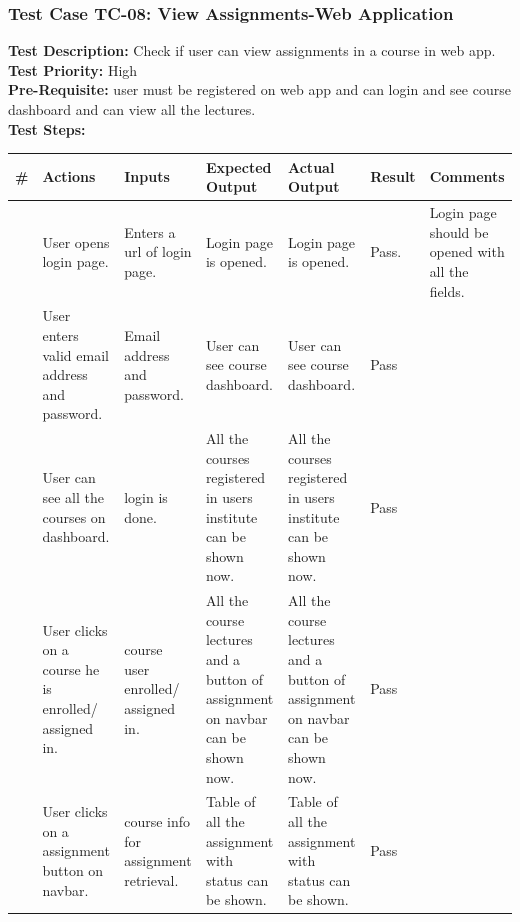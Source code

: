 \documentclass[12pt]{article}
\begin{document}
\subsubsection{Test Case TC-08: View Assignments-Web Application}
\textbf{Test Description: } Check if user can view assignments in a course in web app. \\
\textbf{Test Priority: } High \\
\textbf{Pre-Requisite: } user must be registered on web app and can login and see course dashboard and can view all the lectures. \\
\textbf{Test Steps: }
\begin{longtable}{ |>{\raggedright\arraybackslash} p{0.7cm} | >{\raggedright\arraybackslash}p{2cm}|>{\raggedright\arraybackslash} p{2cm} |>{\raggedright\arraybackslash} p{2.5cm} |>{\raggedright\arraybackslash} p{2.5cm} |>{\raggedright\arraybackslash} p{1.3cm} |>{\raggedright\arraybackslash} p{2.5cm} | } 
\hline
\textbf{\#}
& \textbf{Actions} 
& \textbf{Inputs}
& \textbf{Expected Output} 
& \textbf{Actual Output} 
& \textbf{Result} 
& \textbf{Comments} 
\\ 
\hline
1
& User opens login page. 
& Enters a url of login page.
& Login page is opened.
& Login page is opened.
& Pass.
& Login page should be opened with all the fields.
\\ 
\hline
2 
& User enters valid email address and password.
& Email address and password.
& User can see course dashboard.
& User can see course dashboard. 
& Pass
&  
\\ 
\hline
3
& User can see all the courses on dashboard.
& login is done.
& All the courses registered in users institute can be shown now.
& All the courses registered in users institute can be shown now. 
& Pass
&  
\\ 
\hline
4
& User clicks on a course he is enrolled/ assigned in.
& course user enrolled/ assigned in.
& All the course lectures and a button of assignment on navbar can be shown now.
& All the course lectures and a button of assignment on navbar can be shown now. 
& Pass
&  
\\ 
\hline
5
& User clicks on a assignment button on navbar.
& course info for assignment retrieval.
& Table of all the assignment with status can be shown.
& Table of all the assignment with status can be shown. 
& Pass
&  
\\ 
\hline

\end{longtable}
\end{document}
